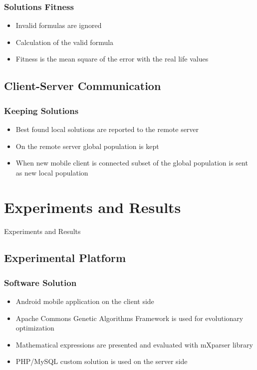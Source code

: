 \documentclass{beamer}
\begin{document}
\begin{frame}
\frametitle{Solutions Fitness}
\begin{itemize}
	\item Invalid formulas are ignored
	\item Calculation of the valid formula 
	\item Fitness is the mean square of the error with the real life values
\end{itemize}
\end{frame}

\subsection{Client-Server Communication}

\begin{frame}
\frametitle{Keeping Solutions}
\begin{itemize}
	\item Best found local solutions are reported to the remote server
	\item On the remote server global population is kept
	\item When new mobile client is connected subset of the global population is sent as new local population
\end{itemize}
\end{frame}

\section{Experiments and Results}

\begin{frame}
\center \huge{Experiments and Results}
\end{frame}

\subsection{Experimental Platform}

\begin{frame}
\frametitle{Software Solution}
\begin{itemize}
	\item Android mobile application on the client side
	\item Apache Commons Genetic Algorithms Framework is used for evolutionary optimization
	\item Mathematical expressions are presented and evaluated with mXparser library
	\item PHP/MySQL custom solution is used on the server side
\end{itemize}
\end{frame}
\end{document}
